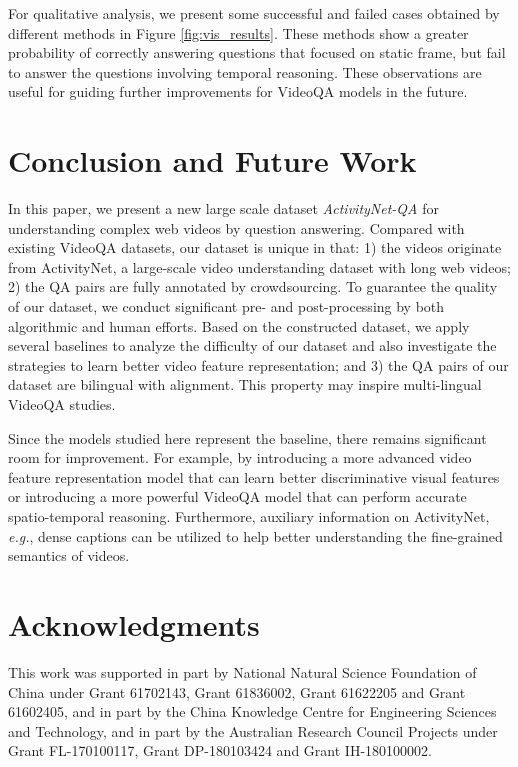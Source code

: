 \documentclass[letterpaper]{article} \usepackage{aaai19}  \usepackage{times}  \usepackage{helvet}  \usepackage{courier}  \usepackage{url}  \usepackage{graphicx}  \usepackage{amsfonts}
\begin{document}
For qualitative analysis, we present some successful and failed cases obtained by different methods in Figure \ref{fig:vis_results}. These methods show a greater probability of correctly answering questions that focused on static frame, but fail to answer the questions involving temporal reasoning. These observations are useful for guiding further improvements for VideoQA models in the future.

\section{Conclusion and Future Work}
In this paper, we present a new large scale dataset \emph{ActivityNet-QA} for understanding complex web videos by question answering. Compared with existing VideoQA datasets, our dataset is unique in that: 1) the videos originate from ActivityNet, a large-scale video understanding dataset with long web videos; 2) the QA pairs are fully annotated by crowdsourcing. To guarantee the quality of our dataset, we conduct significant pre- and post-processing by both algorithmic and human efforts. Based on the constructed dataset, we apply several baselines to analyze the difficulty of our dataset and also investigate the strategies to learn better video feature representation; and 3) the QA pairs of our dataset are bilingual with alignment. This property may inspire multi-lingual VideoQA studies.

Since the models studied here represent the baseline, there remains significant room for improvement. For example, by introducing a more advanced video feature representation model that can learn better discriminative visual features or introducing a more powerful VideoQA model that can perform accurate spatio-temporal reasoning. Furthermore, auxiliary information on ActivityNet, \emph{e.g.}, dense captions \cite{krishna2017dense} can be utilized to help better understanding the fine-grained semantics of videos.

\section*{Acknowledgments}
This work was supported in part by National Natural Science Foundation
of China under Grant 61702143, Grant 61836002, Grant 61622205 and Grant 61602405, and in part by the China Knowledge Centre for Engineering Sciences and Technology, and in part by the Australian Research Council Projects under Grant FL-170100117, Grant DP-180103424 and Grant IH-180100002.



\end{document}

